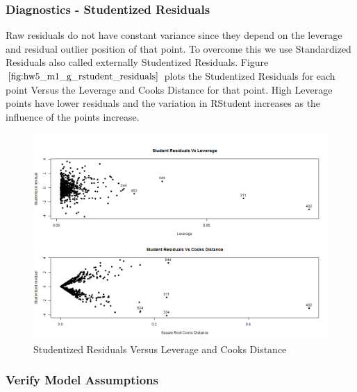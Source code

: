 \documentclass[twoside,12pt]{article}
\begin{document}
\subsubsection{Diagnostics - Studentized Residuals}
\label{rstudent_residuals_cooks_1}
{
Raw residuals do not have constant variance since they depend on the leverage and residual outlier position of that point.
To overcome this we use Standardized Residuals also called externally Studentized Residuals. Figure $\eqref{fig:hw5_m1_g_rstudent_residuals}$ plots the Studentized Residuals for each point Versus the Leverage and Cooks Distance for that point. High Leverage points have lower residuals and the variation in RStudent increases as the influence of the points increase.
\begin{figure}[htbp!]
     \begin{center}
     \hspace*{-1.0in}
             \includegraphics[width=1.3\textwidth]{charts/hw5_m1_g_rstudent_residuals}
    \end{center}
    \caption{%
     Studentized Residuals Versus Leverage and Cooks Distance
     }%
   \label{fig:hw5_m1_g_rstudent_residuals}
\end{figure}
}

\FloatBarrier
\subsubsection{Verify Model Assumptions}
\label{assumptions_lm_1}
\end{document}
